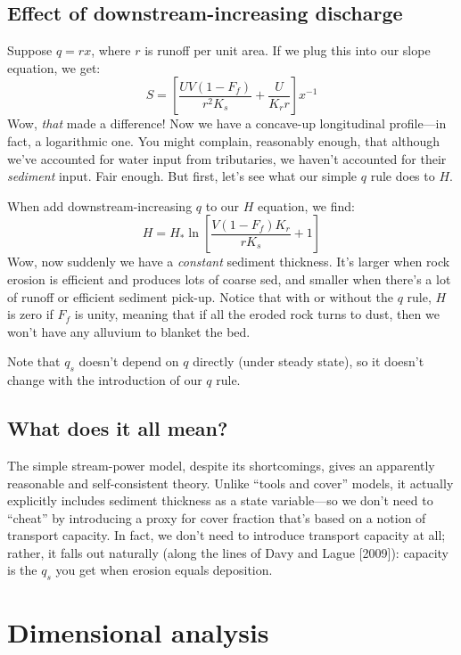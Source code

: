 \documentclass[12pt]{amsart}
\begin{document}
\subsection{Effect of downstream-increasing discharge}

Suppose $q = r x$, where $r$ is runoff per unit area. If we plug this into our slope equation, we get:
\begin{equation}
S = \left[ \frac{UV (1 - F_f)}{r^2 K_s} + \frac{U}{K_r r} \right] x^{-1}
\end{equation}
Wow, {\em that} made a difference! Now we have a concave-up longitudinal profile---in fact, a logarithmic one. You might complain, reasonably enough, that although we've accounted for water input from tributaries, we haven't accounted for their {\em sediment} input. Fair enough. But first, let's see what our simple $q$ rule does to $H$.

When add downstream-increasing $q$ to our $H$ equation, we find:
\begin{equation}
H = H_* \ln \left[ \frac{V (1 - F_f) K_r}{r K_s} + 1 \right]
\end{equation}
Wow, now suddenly we have a {\em constant} sediment thickness. It's larger when rock erosion is efficient and produces lots of coarse sed, and smaller when there's a lot of runoff or efficient sediment pick-up. Notice that with or without the $q$ rule, $H$ is zero if $F_f$ is unity, meaning that if all the eroded rock turns to dust, then we won't have any alluvium to blanket the bed.

Note that $q_s$ doesn't depend on $q$ directly (under steady state), so it doesn't change with the introduction of our $q$ rule.

\subsection{What does it all mean?}

The simple stream-power model, despite its shortcomings, gives an apparently reasonable and self-consistent theory. Unlike ``tools and cover'' models, it actually explicitly includes sediment thickness as a state variable---so we don't need to ``cheat'' by introducing a proxy for cover fraction that's based on a notion of transport capacity. In fact, we don't need to introduce transport capacity at all; rather, it falls out naturally (along the lines of Davy and Lague [2009]): capacity is the $q_s$ you get when erosion equals deposition.

\section{Dimensional analysis}
\end{document}
